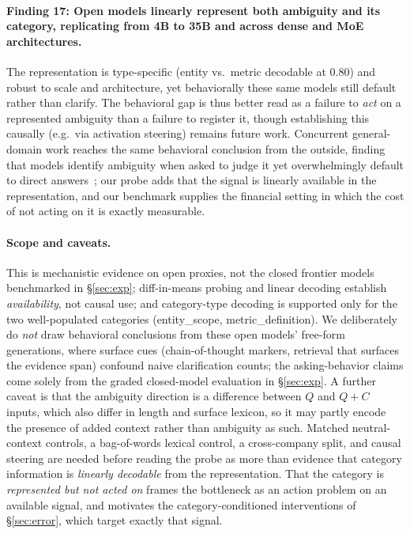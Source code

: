 \paragraph{Finding 17: Open models linearly represent both ambiguity and its category, replicating
from 4B to 35B and across dense and MoE architectures.} The representation is type-specific
(entity vs.\ metric decodable at 0.80) and robust to scale and architecture, yet behaviorally
these same models still default rather than clarify. The behavioral gap is thus better read as a
failure to \emph{act} on a represented ambiguity than a failure to register it, though
establishing this causally (e.g.\ via activation steering) remains future work. Concurrent
general-domain work reaches the same behavioral conclusion from the outside, finding that models
identify ambiguity when asked to judge it yet overwhelmingly default to direct
answers~\citep{su2026knowing}; our probe adds that the signal is linearly available in the
representation, and our benchmark supplies the financial setting in which the cost of not acting
on it is exactly measurable.

\paragraph{Scope and caveats.} This is mechanistic evidence on open proxies, not the closed
frontier models benchmarked in \S\ref{sec:exp}; diff-in-means probing and linear decoding
establish \emph{availability}, not causal use; and category-type decoding is supported only for the
two well-populated categories (entity\_scope, metric\_definition). We deliberately do \emph{not} draw
behavioral conclusions from these open models' free-form generations, where surface cues (chain-of-thought
markers, retrieval that surfaces the evidence span) confound naive clarification counts; the
asking-behavior claims come solely from the graded closed-model evaluation in \S\ref{sec:exp}.
A further caveat is that the ambiguity direction is a difference between $Q$ and $Q{+}C$ inputs,
which also differ in length and surface lexicon, so it may partly encode the presence of added
context rather than ambiguity as such. Matched neutral-context controls, a bag-of-words lexical
control, a cross-company split, and causal steering are needed before reading the probe as more
than evidence that category information is \emph{linearly decodable} from the representation.
That the category is \emph{represented but not acted on} frames the bottleneck as an action
problem on an available signal, and motivates the category-conditioned interventions of
\S\ref{sec:error}, which target exactly that signal.


